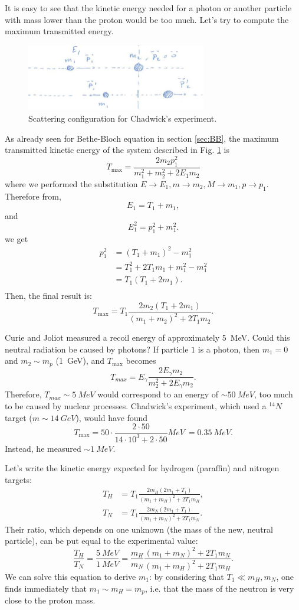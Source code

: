 It is easy to see that the kinetic energy needed for a photon or another particle with mass lower than the proton would be too much. Let's try to compute the maximum transmitted energy. 

\begin{figure}[!h]
    \centering
    \includegraphics[width=0.7\textwidth]{Figures/FNSN16_3.JPG}
    \caption{Scattering configuration for Chadwick's experiment.}
    \label{fig:MaxEnergy}
\end{figure} 

As already seen for Bethe-Bloch equation in section \ref{sec:BB}, the maximum transmitted kinetic energy of the system described in Fig. \ref{fig:MaxEnergy} is
 \[ T_{\max} = \frac{2 m_2 p_1^2}{m_1^2 + m_2^2 + 2E_1m_2}\]
where we performed the substitution $E \rightarrow E_1, m \rightarrow m_2, M \rightarrow m_1, p \rightarrow p_1$.
Therefore from,
 \[ E_1 = T_1 + m_1,\]
 and
 \[ E_1^2 = p_1^2 + m_1^2.\]
 we get
 \begin{eqnarray*}
  p_1^2 &= (T_1 + m_1)^2 - m_1^2 \\
    & = T_1^2 + 2T_1m_1 + m_1^2 - m_1^2 \\
    & =T_1(T_1 + 2m_1).\\
\end{eqnarray*}
 Then, the final result is:
\[T_{\max} = T_1 \frac{2m_2(T_1 + 2m_1)}{(m_1 + m_2)^2 + 2T_1m_2}.\]
 
Curie and Joliot measured a recoil energy of approximately \SI{5}{MeV}.
Could this neutral radiation be caused by photons?
If particle $1$ is a photon, then $m_1 = 0$ and $m_2 \sim m_p$ (\SI{1}{GeV}), and $T_{\max}$ becomes
\[T_{max} = E_{\gamma} \frac{2E_{\gamma}m_2}{m_2^2 + 2E_{\gamma}m_2}.\]
 Therefore, $T_{max} \sim \SI{5}{MeV}$ would correspond to an energy of $\sim \SI{50}{MeV}$, too much to be caused by nuclear processes.
 Chadwick's experiment, which used a $^{14}N$ target ($m \sim \SI{14}{GeV}$), would have found
\[T_{\max} = 50 \cdot \frac{2 \cdot 50}{14\cdot10^3 + 2 \cdot 50 } \si{MeV} \ = \SI{0.35}{MeV}.\]
Instead, he measured $\sim \SI{1}{MeV}$.

Let's write the kinetic energy expected for hydrogen (paraffin) and nitrogen targets:
\begin{align*}
    T_H &= T_1 \frac{2m_H(2m_1 + T_1)}{(m_1 + m_H)^2 + 2T_1m_H},\\
    T_N &= T_1 \frac{2m_N(2m_1 + T_1)}{(m_1 + m_N)^2 + 2T_1m_N}.
\end{align*}
Their ratio, which depends on one unknown (the mass of the new, neutral particle), can be put equal to the experimental value:
\[ \frac{T_H}{T_N} = \frac{\SI{5}{MeV}}{\SI{1}{MeV}}= \frac{m_H}{m_N}\frac{(m_1 + m_N)^2 + 2T_1m_N}{(m_1 + m_H)^2 + 2T_1m_H}.\]
We can solve this equation to derive $m_1$: by considering that $T_1 \ll m_H,m_N$, one finds immediately that $m_1 \sim m_H = m_p$, i.e. that the mass of the neutron is very close to the proton mass.

